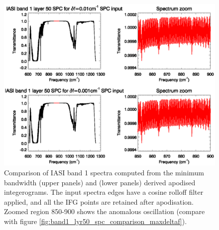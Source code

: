 \begin{figure}[htp]
  \centering
  \includegraphics[scale=0.8]{graphics/band1_lyr50_spc_comparison_mindeltaf.eps}
  \caption{Comparison of IASI band 1 spectra computed from the minimum bandwidth  (upper panels) and  (lower panels) derived apodised integerograms. The input spectra edges have a cosine rolloff filter applied, and all the IFG points are retained after apodisation. Zoomed region 850-900{\invcm} shows the anomalous oscillation (compare with figure \ref{fig:band1_lyr50_spc_comparison_maxdeltaf}).}
  \label{fig:band1_lyr50_spc_comparison_mindeltaf}
\end{figure}

